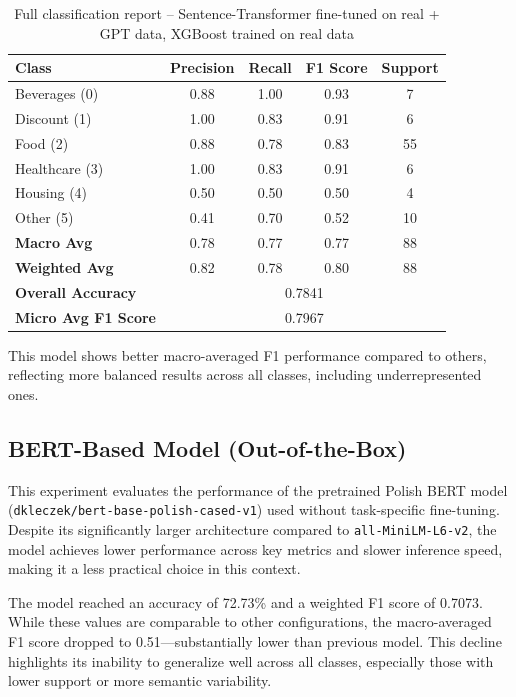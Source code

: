 \documentclass{SGGW-thesis-EN}
\begin{document}
\begin{table}[h!]
  \centering
  \caption{Full classification report – Sentence-Transformer fine-tuned on real + GPT data, XGBoost trained on real data}
  \label{tab:finetuned_st_real_clf_report}
  \begin{tabularx}{\textwidth}{lcccc}
    \toprule
    \textbf{Class} & \textbf{Precision} & \textbf{Recall} & \textbf{F1 Score} & \textbf{Support} \\
    \midrule
    Beverages (0)     & 0.88 & 1.00 & 0.93 & 7 \\
    Discount (1)      & 1.00 & 0.83 & 0.91 & 6 \\
    Food (2)          & 0.88 & 0.78 & 0.83 & 55 \\
    Healthcare (3)    & 1.00 & 0.83 & 0.91 & 6 \\
    Housing (4)       & 0.50 & 0.50 & 0.50 & 4 \\
    Other (5)         & 0.41 & 0.70 & 0.52 & 10 \\
    \midrule
    \textbf{Macro Avg}         & 0.78 & 0.77 & 0.77 & 88 \\
    \textbf{Weighted Avg}      & 0.82 & 0.78 & 0.80 & 88 \\
    \textbf{Overall Accuracy}  & \multicolumn{4}{c}{0.7841} \\
    \textbf{Micro Avg F1 Score}& \multicolumn{4}{c}{0.7967} \\
    \bottomrule
  \end{tabularx}
\end{table}

This model shows better macro-averaged F1 performance compared to others, reflecting more balanced results across all classes, including  
underrepresented ones.

\subsection{BERT-Based Model (Out-of-the-Box)}

This experiment evaluates the performance of the pretrained Polish BERT model (\texttt{dkleczek/bert-base-polish-cased-v1}) used without  
task-specific fine-tuning. Despite its significantly larger architecture compared to \texttt{all-MiniLM-L6-v2}, the model achieves lower performance across  
key metrics and slower inference speed, making it a less practical choice in this context.

The model reached an accuracy of 72.73\% and a weighted F1 score of 0.7073. While these values are comparable to other configurations, the  
macro-averaged F1 score dropped to 0.51—substantially lower than previous model. This decline highlights  
its inability to generalize well across all classes, especially those with lower support or more semantic variability.
\end{document}
